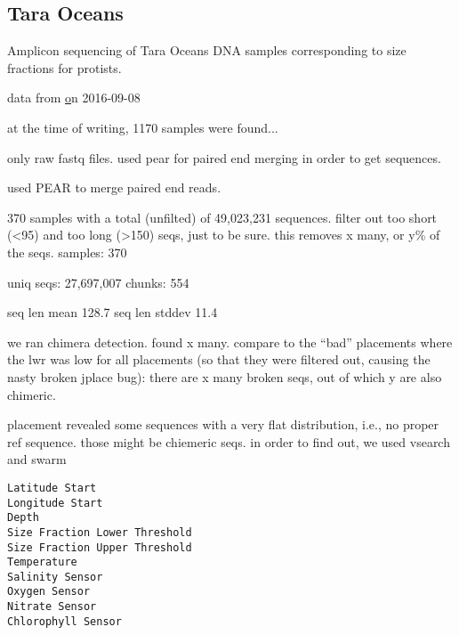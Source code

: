 
\subsection{Tara Oceans}
\label{sec:MetagenomicDatasets:sub:TaraOceans}


Amplicon sequencing of Tara Oceans DNA samples corresponding to size fractions for protists.

data from \href{https://www.ebi.ac.uk/ena/data/view/PRJEB6610}
on 2016-09-08

at the time of writing, 1170 samples were found...



only raw fastq files. used pear for paired end merging in order to get sequences.

used PEAR \cite{Zhang2014} to merge paired end reads.

370 samples with a total (unfilted) of 49,023,231 sequences.
filter out too short (<95) and too long (>150) seqs, just to be sure.
this removes x many, or y\% of the seqs.
samples: 370

uniq seqs: 27,697,007
chunks: 554

seq len mean 128.7
seq len stddev 11.4

we ran chimera detection. found x many.
compare to the ``bad'' placements where the lwr was low for all placements
(so that they were filtered out, causing the nasty broken jplace bug):
there are x many broken seqs, out of which y are also chimeric.

placement revealed some sequences with a very flat distribution, i.e., no proper ref sequence.
those might be chiemeric seqs. in order to find out, we used vsearch and swarm

\begin{verbatim}
Latitude Start
Longitude Start
Depth
Size Fraction Lower Threshold
Size Fraction Upper Threshold
Temperature
Salinity Sensor
Oxygen Sensor
Nitrate Sensor
Chlorophyll Sensor
\end{verbatim}


